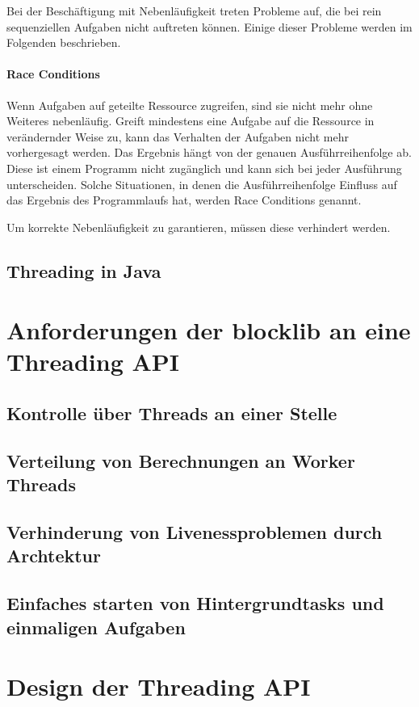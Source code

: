 \documentclass[12pt,a4paper,listof=totocnumbered,parskip=half]{scrreprt}
\begin{document}
Bei der Beschäftigung mit Nebenläufigkeit treten Probleme auf, die bei rein sequenziellen Aufgaben nicht auftreten können. Einige dieser Probleme werden im Folgenden beschrieben.

\paragraph{Race Conditions} Wenn Aufgaben auf geteilte Ressource zugreifen, sind sie nicht mehr ohne Weiteres nebenläufig. Greift mindestens eine Aufgabe auf die Ressource in verändernder Weise zu, kann das Verhalten der Aufgaben nicht mehr vorhergesagt werden. Das Ergebnis hängt von der genauen Ausführreihenfolge ab. Diese ist einem Programm nicht zugänglich und kann sich bei jeder Ausführung unterscheiden. Solche Situationen, in denen die Ausführreihenfolge Einfluss auf das Ergebnis des Programmlaufs hat, werden Race Conditions genannt.

Um korrekte Nebenläufigkeit zu garantieren, müssen diese verhindert werden.\cite{Friesen2015}\cite{Pike2012}\cite{Harper2011}\cite{Hettel2016}
\subsection{Threading in Java}
\section{Anforderungen der blocklib an eine Threading API}
\subsection{Kontrolle über Threads an einer Stelle}
\subsection{Verteilung von Berechnungen an Worker Threads}
\subsection{Verhinderung von Livenessproblemen durch Archtektur}
\subsection{Einfaches starten von Hintergrundtasks und einmaligen Aufgaben}
\section{Design der Threading API}
\end{document}
